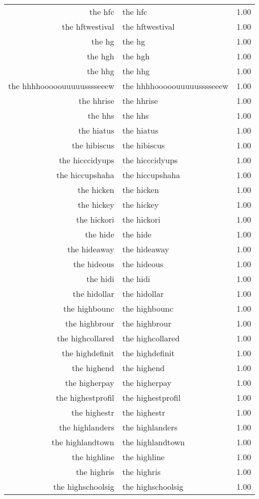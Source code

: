 \begin{table}[ht]
\begin{tabular}{rlr}
  the hfc & the hfc & 1.00 \\ 
  the hftwestival & the hftwestival & 1.00 \\ 
  the hg & the hg & 1.00 \\ 
  the hgh & the hgh & 1.00 \\ 
  the hhg & the hhg & 1.00 \\ 
  the hhhhooooouuuuusssseeew & the hhhhooooouuuuusssseeew & 1.00 \\ 
  the hhrise & the hhrise & 1.00 \\ 
  the hhs & the hhs & 1.00 \\ 
  the hiatus & the hiatus & 1.00 \\ 
  the hibiscus & the hibiscus & 1.00 \\ 
  the hicccidyups & the hicccidyups & 1.00 \\ 
  the hiccupshaha & the hiccupshaha & 1.00 \\ 
  the hicken & the hicken & 1.00 \\ 
  the hickey & the hickey & 1.00 \\ 
  the hickori & the hickori & 1.00 \\ 
  the hide & the hide & 1.00 \\ 
  the hideaway & the hideaway & 1.00 \\ 
  the hideous & the hideous & 1.00 \\ 
  the hidi & the hidi & 1.00 \\ 
  the hidollar & the hidollar & 1.00 \\ 
  the highbounc & the highbounc & 1.00 \\ 
  the highbrour & the highbrour & 1.00 \\ 
  the highcollared & the highcollared & 1.00 \\ 
  the highdefinit & the highdefinit & 1.00 \\ 
  the highend & the highend & 1.00 \\ 
  the higherpay & the higherpay & 1.00 \\ 
  the highestprofil & the highestprofil & 1.00 \\ 
  the highestr & the highestr & 1.00 \\ 
  the highlanders & the highlanders & 1.00 \\ 
  the highlandtown & the highlandtown & 1.00 \\ 
  the highline & the highline & 1.00 \\ 
  the highris & the highris & 1.00 \\ 
  the highschoolsig & the highschoolsig & 1.00 \\ 

\end{tabular}
\end{table}
